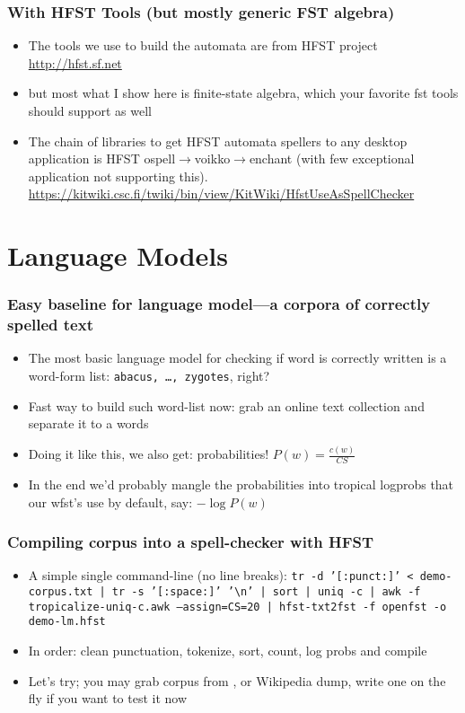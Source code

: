 \documentclass[t,12pt,pdftex]{beamer}
\begin{document}
\begin{frame}
    \frametitle{With HFST Tools (but mostly generic FST algebra)}
    
    \begin{itemize}
        \item The tools we use to build the automata are from HFST project
            \url{http://hfst.sf.net}
        \item but most what I show here is finite-state algebra, which your
            favorite fst tools should support as well
        \item The chain of libraries to get HFST automata spellers to any
            desktop application is HFST 
            ospell$\rightarrow$voikko$\rightarrow$enchant (with few
            exceptional application not supporting this).
            \url{https://kitwiki.csc.fi/twiki/bin/view/KitWiki/HfstUseAsSpellChecker}
    \end{itemize}
\end{frame}

\section{Language Models}

\begin{frame}
    \frametitle{Easy baseline for language model---a corpora of correctly
    spelled text}
    \begin{itemize}
        \item The most basic language model for checking if word is correctly
            written is a word-form list: \texttt{abacus, \ldots, zygotes}, 
            right?
        \item Fast way to build such word-list now: grab an online text
            collection and separate it to a words
        \item Doing it like this, we also get: probabilities!
            $P(w) = \frac{c(w)}{CS}$
        \item In the end we'd probably mangle the probabilities into
            tropical logprobs that our wfst's use by default, say:
            $-\log P(w)$
    \end{itemize}
\end{frame}

\begin{frame}
    \frametitle{Compiling corpus into a spell-checker with HFST}
    \begin{itemize}
        \item A simple single command-line (no line breaks):
            \texttt{tr -d '[:punct:]' < demo-corpus.txt |
            tr -s '[:space:]' '\textbackslash n' |
            sort | uniq -c |
            awk -f tropicalize-uniq-c.awk --assign=CS=20 |
            hfst-txt2fst -f openfst -o demo-lm.hfst}
        \item In order: clean punctuation, tokenize, sort, count, log probs and
            compile
        \item Let's try; you may grab corpus from
            \url{}, or Wikipedia dump,  write one on the fly if you want to
            test it now
    \end{itemize}
\end{frame}
\end{document}
